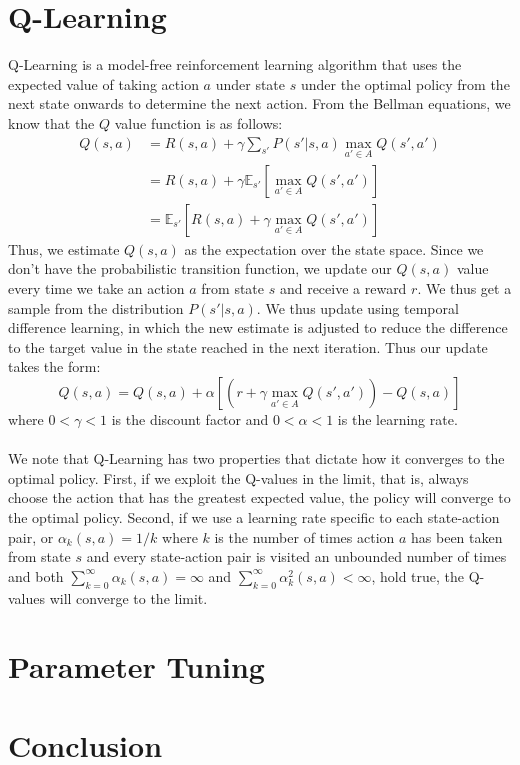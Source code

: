 \documentclass[10pt, oneside]{article}
\begin{document}
\section{Q-Learning}
Q-Learning is a model-free reinforcement learning algorithm that uses the expected value of taking action $a$ under state $s$ under the optimal policy from the next state onwards to determine the next action. From the Bellman equations, we know that the $Q$ value function is as follows:
\begin{align*}
Q(s, a) &= R(s, a) + \gamma \sum_{s'}P(s' | s, a) \max_{a' \in A} Q(s', a')\\
&= R(s, a) + \gamma\mathbb{E}_{s'}[\max_{a'\in A} Q(s', a')]\\
&= \mathbb{E}_{s'}[R(s, a) + \gamma\max_{a' \in A} Q(s', a')]
\end{align*} 
Thus, we estimate $Q(s, a)$ as the expectation over the state space. Since we don't have the probabilistic transition function, we update our $Q(s, a)$ value every time we take an action $a$ from state $s$ and receive a reward $r$. We thus get a sample from the distribution $P(s'|s, a)$. We thus update using temporal difference learning, in which the new estimate is adjusted to reduce the difference to the target value in the state reached in the next iteration. Thus our update takes the form:
\[Q(s, a)  = Q(s, a) + \alpha[(r + \gamma\max_{a'\in A} Q(s', a'))-Q(s, a)]\]
where $0 < \gamma < 1$ is the discount factor and $0<\alpha<1$ is the learning rate. \\\\
We note that Q-Learning has two properties that dictate how it converges to the optimal policy. First, if we exploit the Q-values in the limit, that is, always choose the action that has the greatest expected value, the policy will converge to the optimal policy. Second, if we use a learning rate specific to each state-action pair, or $\alpha_k(s, a) = 1/k$ where $k$ is the number of times action $a$ has been taken from state $s$ and every state-action pair is visited an unbounded number of times and both $\sum_{k=0}^\infty \alpha_k(s, a) = \infty$ and $\sum_{k=0}^\infty \alpha_k^2(s, a) < \infty$,  hold true, the Q-values will converge to the limit. 
\section{Parameter Tuning}
\section{Conclusion} 
\end{document}
